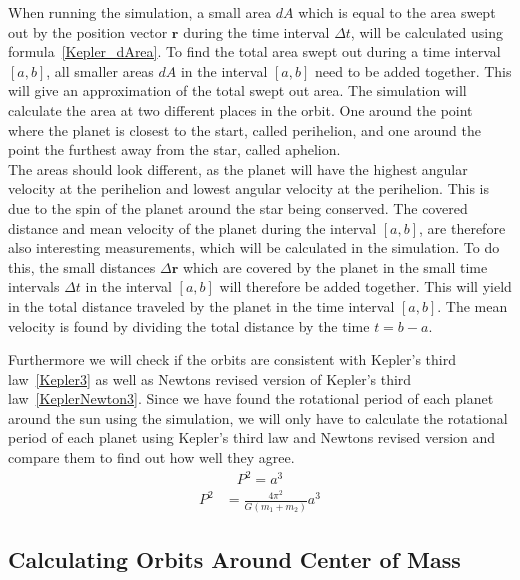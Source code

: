 \documentclass[reprint,english,notitlepage]{revtex4-2}
\begin{document}
When running the simulation, a small area $dA$ which is equal to the area swept out by the position vector $\textbf{r}$ during the time interval $\Delta t$, will be calculated using formula~\eqref{Kepler_dArea}.
To find the total area swept out during a time interval $[a, b]$, all smaller areas $dA$ in the interval $[a, b]$ need to be added together.
This will give an approximation of the total swept out area.
The simulation will calculate the area at two different places in the orbit.
One around the point where the planet is closest to the start, called perihelion, and one around the point the furthest away from the star, called aphelion.\\
The areas should look different, as the planet will have the highest angular velocity at the perihelion and lowest angular velocity at the perihelion.
This is due to the spin of the planet around the star being conserved.
The covered distance and mean velocity of the planet during the interval $[a, b]$, are therefore also interesting measurements, which will be calculated in the simulation.
To do this, the small distances $\Delta \textbf{r}$ which are covered by the planet in the small time intervals $\Delta t$ in the interval $[a, b]$ will therefore be added together.
This will yield in the total distance traveled by the planet in the time interval $[a, b]$.
The mean velocity is found by dividing the total distance by the time $t = b-a$.\newline

Furthermore we will check if the orbits are consistent with Kepler's third law~\eqref{Kepler3} as well as Newtons revised version of Kepler's third law~\eqref{KeplerNewton3}.
Since we have found the rotational period of each planet around the sun using the simulation, we will only have to calculate the rotational period of each planet using Kepler's third law and Newtons revised version and compare them to find out how well they agree.
\begin{align}
    P^2 = a^3 \label{Kepler3}
\end{align}
\begin{align}
	P^2 &= \frac{4 \pi^2}{G \left( m_1 + m_2 \right)} a^3 \label{KeplerNewton3}
\end{align}

\subsection{Calculating Orbits Around Center of Mass}\label{Method orbit calc}
\end{document}
